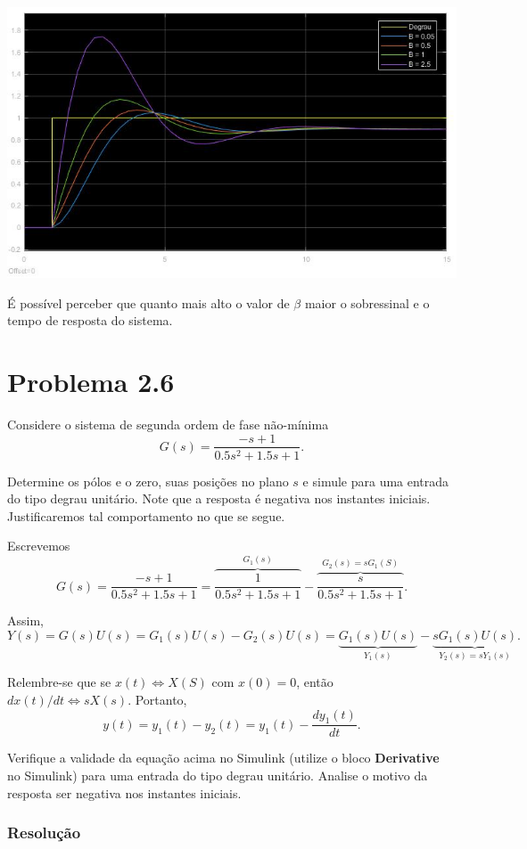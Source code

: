 \documentclass[
]{book}
\theoremstyle{definition}
\theoremstyle{definition}
\theoremstyle{definition}
\theoremstyle{remark}
\begin{document}
\includegraphics{Imagens/Lab2/prob5SimResult.jpg}

É possível perceber que quanto mais alto o valor de \(\beta\) maior o sobressinal e o tempo de resposta do sistema.

\hypertarget{problema-2.6}{%
\section*{Problema 2.6}\label{problema-2.6}}

Considere o sistema de segunda ordem de fase não-mínima
\[
G(s) = \frac {-s+1}{0.5s^2+1.5s+1}.
\]

Determine os pólos e o zero, suas posições no plano \(s\) e simule para uma entrada do tipo degrau unitário. Note que a resposta é negativa nos instantes iniciais. Justificaremos tal comportamento no que se segue.

Escrevemos
\[
G(s) = \frac {-s+1}{0.5s^2+1.5s+1} = \overbrace{\frac {1}{0.5s^2+1.5s+1}}^{G_1(s)} - \overbrace{\frac {s}{0.5s^2+1.5s+1}}^{G_2(s) = sG_1(S)}.
\]

Assim,
\[
Y(s) = G(s)U(s) = G_1(s)U(s)-G_2(s)U(s) = \underbrace{G_1(s)U(s)}_{Y_1(s)} - \underbrace{sG_1(s)U(s)}_{Y_2(s) = sY_1(s)}.
\]

Relembre-se que se \(x(t) \iff X(S)\) com \(x(0) = 0\), então \(dx(t)/dt \iff sX(s)\). Portanto,
\[
y(t) = y_1(t)-y_2(t)=y_1(t)- \frac {dy_1(t)}{dt}.
\]

Verifique a validade da equação acima no Simulink (utilize o bloco \textbf{Derivative} no Simulink) para uma entrada do tipo degrau unitário. Analise o motivo da resposta ser negativa nos instantes iniciais.

\hypertarget{resoluuxe7uxe3o-5}{%
\subsubsection*{Resolução}\label{resoluuxe7uxe3o-5}}
\end{document}
